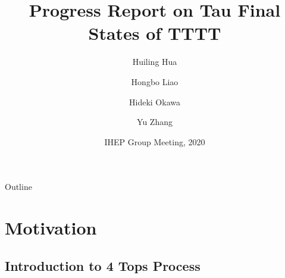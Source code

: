 \documentclass{beamer}
\title[IHEP Group Meeting] %
{Progress Report on Tau Final States of TTTT}
\author[Huiling Hua] %
{Huiling Hua\inst{1} \and Hongbo Liao\inst{1} \and Hideki Okawa\inst{2} \and Yu    Zhang\inst{2}}
\institute[IHEP] %
{
  \inst{1}%
    IHEP
  \and
  \inst{2}%
    Fudan University
}
\date[IHEP 2020] %
{IHEP Group Meeting, 2020}
\begin{document}
\begin{frame}
  \titlepage
\end{frame}

\begin{frame}{Outline}
  \tableofcontents
\end{frame}





\section{Motivation}
\subsection{Introduction to 4 Tops Process}



\end{document}
